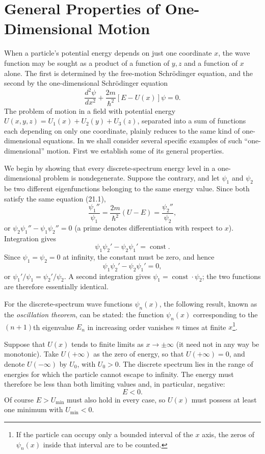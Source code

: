 \section{General Properties of One-Dimensional Motion}

When a particle's potential energy depends on just one coordinate $x$, the
wave function may be sought as a product of a function of $y,z$ and a function
of $x$ alone. The first is determined by the free-motion Schrödinger equation,
and the second by the one-dimensional Schrödinger equation
\begin{equation}
  \frac{d^2\psi}{dx^2}+\frac{2m}{\hbar^2}[E-U(x)]\psi=0.
  \tag{21.1}
\end{equation}
The problem of motion in a field with potential energy
$U(x,y,z)=U_1(x)+U_2(y)+U_3(z)$, separated into a sum of functions each
depending on only one coordinate, plainly reduces to the same kind of
one-dimensional equations. In  we shall consider several specific
examples of such ``one-dimensional'' motion. First we establish some of its
general properties.

We begin by showing that every discrete-spectrum energy level in a
one-dimensional problem is nondegenerate. Suppose the contrary, and let
$\psi_1$ and $\psi_2$ be two different eigenfunctions belonging to the same
energy value. Since both satisfy the same equation (21.1),
\[
  \frac{\psi_1''}{\psi_1}
  =\frac{2m}{\hbar^2}(U-E)
  =\frac{\psi_2''}{\psi_2},
\]
or $\psi_2\psi_1''-\psi_1\psi_2''=0$ (a prime denotes differentiation with
respect to $x$). Integration gives
\begin{equation}
  \psi_1\psi_2'-\psi_2\psi_1'=\operatorname{const}.
  \tag{21.2}
\end{equation}
Since $\psi_1=\psi_2=0$ at infinity, the constant must be zero, and hence
\[
  \psi_1\psi_2'-\psi_2\psi_1'=0,
\]
or $\psi_1'/\psi_1=\psi_2'/\psi_2$. A second integration gives
$\psi_1=\operatorname{const}\cdot\psi_2$; the two functions are therefore
essentially identical.

For the discrete-spectrum wave functions $\psi_n(x)$, the following result,
known as the \emph{oscillation theorem}, can be stated: the function
$\psi_n(x)$ corresponding to the $(n+1)$th eigenvalue $E_n$ in increasing
order vanishes $n$ times at finite $x$\footnote{If the particle can occupy
only a bounded interval of the $x$ axis, the zeros of $\psi_n(x)$ inside that
interval are to be counted.}.

Suppose that $U(x)$ tends to finite limits as $x\to\pm\infty$ (it need not in
any way be monotonic). Take $U(+\infty)$ as the zero of energy, so that
$U(+\infty)=0$, and denote $U(-\infty)$ by $U_0$, with $U_0>0$. The discrete
spectrum lies in the range of energies for which the particle cannot escape
to infinity. The energy must therefore be less than both limiting values and,
in particular, negative:
\begin{equation}
  E<0.
  \tag{21.3}
\end{equation}
Of course $E>U_{\min}$ must also hold in every case, so $U(x)$ must possess at
least one minimum with $U_{\min}<0$.

